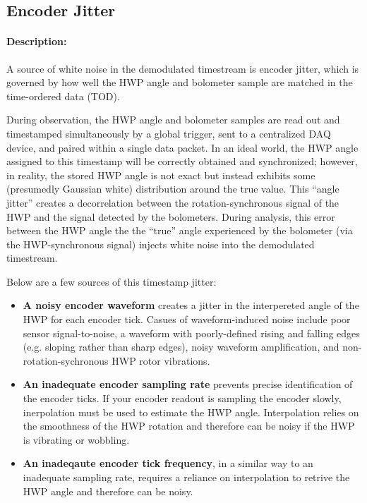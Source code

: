 \subsection{Encoder Jitter}

\paragraph{Description:} 

A source of white noise in the demodulated timestream is encoder jitter, which is governed by how well the HWP angle and bolometer sample are matched in the time-ordered data (TOD). 

During observation, the HWP angle and bolometer samples are read out and timestamped simultaneously by a global trigger, sent to a centralized DAQ device, and paired within a single data packet. In an ideal world, the HWP angle assigned to this timestamp will be correctly obtained and synchronized; however, in reality, the stored HWP angle is not exact but instead exhibits some (presumedly Gaussian white) distribution around the true value. This ``angle jitter'' creates a decorrelation between the rotation-synchronous signal of the HWP and the signal detected by the bolometers. During analysis, this error between the HWP angle the the ``true'' angle experienced by the bolometer (via the HWP-synchronous signal) injects white noise into the demodulated timestream.

Below are a few sources of this timestamp jitter:

\begin{itemize}
 \item \textbf{A noisy encoder waveform} creates a jitter in the interpereted angle of the HWP for each encoder tick. Casues of waveform-induced noise include poor sensor signal-to-noise, a waveform with poorly-defined rising and falling edges (e.g. sloping rather than sharp edges), noisy waveform amplification, and non-rotation-sychronous HWP rotor vibrations.
 \item \textbf{An inadequate encoder sampling rate} prevents precise identification of the encoder ticks. If your encoder readout is sampling the encoder slowly, inerpolation must be used to estimate the HWP angle. Interpolation relies on the smoothness of the HWP rotation and therefore can be noisy if the HWP is vibrating or wobbling.
 \item \textbf{An inadeqaute encoder tick frequency}, in a similar way to an inadequate sampling rate, requires a reliance on interpolation to retrive the HWP angle and therefore can be noisy.
 \end{itemize}
 

